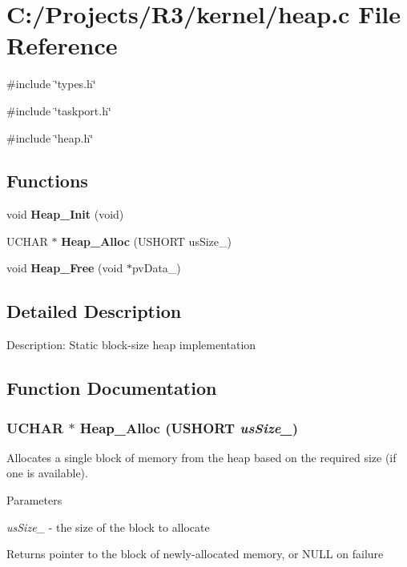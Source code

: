 \section{C:/Projects/R3/kernel/heap.c File Reference}
\label{heap_8c}
{\ttfamily \#include \char`\"{}types.h\char`\"{}}\par
{\ttfamily \#include \char`\"{}taskport.h\char`\"{}}\par
{\ttfamily \#include \char`\"{}heap.h\char`\"{}}\par
\subsection*{Functions}
\begin{DoxyCompactItemize}
\item 
void {\bf Heap\_\-Init} (void)
\item 
UCHAR $\ast$ {\bf Heap\_\-Alloc} (USHORT usSize\_\-)
\item 
void {\bf Heap\_\-Free} (void $\ast$pvData\_\-)
\end{DoxyCompactItemize}


\subsection{Detailed Description}
Description: Static block-\/size heap implementation 

\subsection{Function Documentation}
\subsubsection[{Heap\_\-Alloc}]{\setlength{\rightskip}{0pt plus 5cm}UCHAR $\ast$ Heap\_\-Alloc (USHORT {\em usSize\_\-})}\label{heap_8c_af2ad221b693a4f00e67a7c9df53936de}
Allocates a single block of memory from the heap based on the required size (if one is available).


\begin{DoxyParams}{Parameters}
\item[{\em usSize\_\-}]-\/ the size of the block to allocate \end{DoxyParams}
\begin{DoxyReturn}{Returns}
pointer to the block of newly-\/allocated memory, or NULL on failure 
\end{DoxyReturn}
